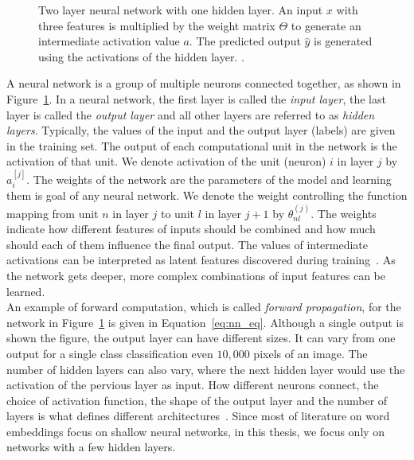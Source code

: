 \begin{figure}
\centering 
\resizebox{0.75\textwidth}{0.45\textwidth}{      

}
\caption{Two layer neural network with one hidden layer. An input $x$ with three features is multiplied by the weight matrix $\Theta$ to generate an intermediate activation value $a$. The predicted output $\hat { y } $ is generated using the activations of the hidden layer.  \protect \footnotemark .}

\label{fig:nn}

\end{figure}
\noindent
A neural network is a group of multiple neurons connected together, as shown in Figure~\ref{fig:nn}. In a neural network, the first layer is called the \emph{input layer}, the last layer is called the \emph{output layer} and all other layers are referred to as \emph{hidden layers}.
Typically, the values of the input and the output layer (labels) are given in the training set. The output of each computational unit in the network is the activation of that unit. We denote activation of the unit (neuron) $i$ in layer $j$ by $a_{i}^{[j]}$. The weights of the network are the parameters of the model and learning them is goal of any neural network. We denote the weight controlling the function mapping from unit $n$ in layer $j$ to unit $l$ in layer $j+1$ by
$\theta^{(j)}_{nl}$. The weights indicate how different features of inputs should be combined and how much should each of them influence the final output. The values of intermediate activations can be interpreted as latent features discovered during training~. As the network gets deeper, more complex combinations of input features can be learned. \\
An example of forward computation, which is called \emph{forward propagation}, for the network in Figure~\ref{fig:nn} is given in Equation~\ref{eq:nn_eq}. Although a single output is shown the figure, the output layer can have different sizes. It can vary from one output for a single class classification even $10,000$ pixels of an image. The number of hidden layers can also vary, where the next hidden layer would use the activation of the pervious layer as input. How different neurons connect, the choice of activation function, the shape of the output layer and the number of layers is what defines different architectures~. Since most of literature on word embeddings focus on shallow neural networks, in this thesis, we focus only on networks with a few hidden layers. 
